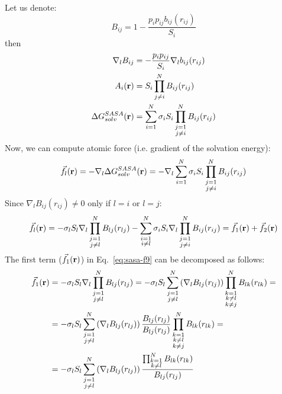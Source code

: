 \documentclass[11pt]{book}
\begin{document}
Let us denote:
\begin{equation}\label{eq:sasa-f6}
B_{ij}=1-\frac{p_{i}p_{ij}b_{ij}(r_{ij})}{S_{i}}
\end{equation}
then
\begin{equation}\label{eq:sasa-f7}
\begin{split}
\nabla_{l}B_{ij}&=-\frac{p_{i}p_{ij}}{S_{i}}\nabla_{l}b_{ij}(r_{ij})\\
A_{i}({\bf r})&=S_{i}\prod_{j\ne i}^{N}B_{ij}(r_{ij})\\
\Delta G_{solv}^{SASA}({\bf r})&=\sum_{i=1}^{N}\sigma_{i}S_{i}\prod_{\substack{j=1\\j\ne i}}^{N}B_{ij}(r_{ij})
\end{split}
\end{equation}
Now, we can compute atomic force (i.e. gradient of the solvation energy):
\begin{equation}\label{eq:sasa-f8}
\vec{f}_{l}({\bf r})=-\nabla_{l}\Delta G_{solv}^{SASA}({\bf r})=-\nabla_{l}\sum_{i=1}^{N}\sigma_{i}S_{i}\prod_{\substack{j=1\\j\ne i}}^{N}B_{ij}(r_{ij})
\end{equation}
Since $\nabla_{l}B_{ij}(r_{ij})\ne 0$ only if $l=i$ or $l=j$:
\begin{equation}\label{eq:sasa-f9}
\begin{split}
\vec{f}_{l}({\bf r})=-\sigma_{l}S_{l}\nabla_{l}\prod_{\substack{j=1\\j\ne l}}^{N}B_{lj}(r_{lj})-\sum_{\substack{i=1\\i\ne l}}^{N}\sigma_{i}S_{i}\nabla_{l}\prod_{\substack{j=1\\j\ne i}}^{N}B_{ij}(r_{ij})=\vec{f}_{1}({\bf r})+\vec{f}_{2}({\bf r})
\end{split}
\end{equation}
The first term ($\vec{f}_{1}({\bf r})$) in Eq.~\ref{eq:sasa-f9} can be decomposed as follows:
\begin{equation}\label{eq:sasa-f10}
\begin{split}
\vec{f}_{1}({\bf r})&=-\sigma_{l}S_{l}\nabla_{l}\prod_{\substack{j=1\\j\ne l}}^{N}B_{lj}(r_{lj})=-\sigma_{l}S_{l}\sum_{\substack{j=1\\j\ne l}}^{N}\left(\nabla_{l}B_{lj}(r_{lj})\right)\prod_{\substack{k=1\\k\ne l\\k\ne j}}^{N}B_{lk}(r_{lk})=\\
&=-\sigma_{l}S_{l}\sum_{\substack{j=1\\j\ne l}}^{N}\left(\nabla_{l}B_{lj}(r_{lj})\right)\frac{B_{lj}(r_{lj})}{B_{lj}(r_{lj})}\prod_{\substack{k=1\\k\ne l\\k\ne j}}^{N}B_{lk}(r_{lk})=\\
&=-\sigma_{l}S_{l}\sum_{\substack{j=1\\j\ne l}}^{N}\left(\nabla_{l}B_{lj}(r_{lj})\right)\frac{\prod_{\substack{k=1\\k\ne l}}^{N}B_{lk}(r_{lk})}{B_{lj}(r_{lj})}
\end{split}
\end{equation}
\end{document}
